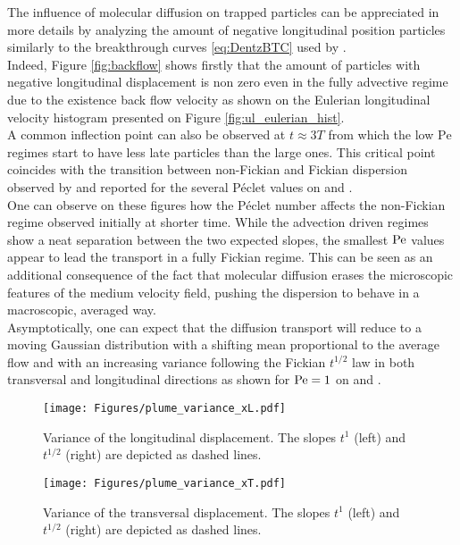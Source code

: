 The influence of molecular diffusion on trapped particles can be appreciated in more details by analyzing the amount of negative longitudinal position particles similarly to the breakthrough curves \eqref{eq:DentzBTC} used by \citet{Dentz2017}.\\ 
Indeed, Figure \ref{fig:backflow} shows firstly that the amount of particles with negative longitudinal displacement is non zero even in the fully advective regime due to the existence back flow velocity as shown on the Eulerian longitudinal velocity histogram presented on Figure \ref{fig:ul_eulerian_hist}.\\
A common inflection point can also be observed at $t\approx3T$ from which the low $\mathrm{Pe}$ regimes start to have less late particles than the large ones.
This critical point coincides with the transition between non-Fickian and Fickian dispersion observed by \citet[Fig. 2]{Meyer2016} and reported for the several Péclet values on  and .\\
One can observe on these figures how the Péclet number affects the non-Fickian regime observed initially at shorter time.
While the advection driven regimes show a neat separation between the two expected slopes, the smallest $\mathrm{Pe}$ values appear to lead the transport in a fully Fickian regime. 
This can be seen as an additional consequence of the fact that molecular diffusion erases the microscopic features of the medium velocity field, pushing the dispersion to behave in a macroscopic, averaged way.\\
Asymptotically, one can expect that the diffusion transport will reduce to a moving Gaussian distribution with a shifting mean proportional to the average flow and with an increasing variance following the Fickian $t^{1/2}$ law in both transversal and longitudinal directions as shown for $\mathrm{Pe} = 1$ on  and .\\

\begin{figure} [h!]
	\centering
	\begin{minipage}{.49\textwidth}
		\centering
		\texttt{[image: Figures/plume\_variance\_xL.pdf]}
		\caption{Variance of the longitudinal displacement. The slopes $t^1$ (left) and $t^{1/2}$ (right) are depicted as dashed lines.}
		\label{fig:plume_variance_xL}
	\end{minipage}
	\begin{minipage}{.49\textwidth}
		\centering
		\texttt{[image: Figures/plume\_variance\_xT.pdf]}
		\caption{Variance of the transversal displacement. The slopes $t^1$ (left) and $t^{1/2}$ (right) are depicted as dashed lines.}
		\label{fig:plume_variance_xT}
	\end{minipage}
\end{figure}

